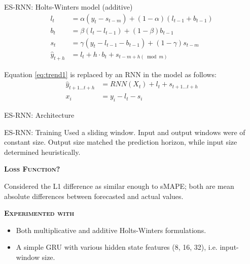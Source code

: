 \documentclass[aspectratio=169, 12pt]{beamer}
\begin{document}
\begin{frame}{ES-RNN: Holts-Winters model (additive)}
\begin{align}
    l_t &= \alpha (y_t - s_{t-m}) + (1 - \alpha) (l_{t-1} + b_{t-1}) \label{eq:level1}\\
    b_t &= \beta (l_t - l_{t-1}) + (1- \beta) b_{t-1} \label{eq:trend1}\\ 
    s_t &= \gamma (y_t - l_{t-1} - b_{t-1}) + (1-\gamma) s_{t-m} \label{eq:season1}\\
    \hat{y}_{t+h} &= l_t + h \cdot b_t + s_{t-m+h (\bmod m)} \label{eq:predEq1}
\end{align}

Equation \ref{eq:trend1} is replaced by an RNN in the model as follows:
\begin{align}
    \hat{y}_{t+1 \dots t+h} &= RNN(X_t) + l_t + s_{t+1 \dots t+h} \label{eq:modifiedEq1}\\
    x_i &= y_i - l_t - s_i \label{eq:x1}
\end{align}

\end{frame}

\begin{frame}[fragile]{ES-RNN: Architecture}
    \begin{figure}[htbp]
    \centering
    \def\svgwidth{\columnwidth}
    
    \end{figure}
\end{frame}

\begin{frame}{ES-RNN: Training}
Used a sliding window. Input and output windows were of constant size. Output size matched the prediction horizon, while input size determined heuristically.
\begin{center}
    \textsc{\textbf{Loss Function?}}
\end{center}
Considered the L1 difference as similar enough to sMAPE; both are mean absolute differences between forecasted and actual values.
\begin{center}
    \textsc{\textbf{Experimented with}}
\end{center}
    \begin{itemize}
        \item Both multiplicative and additive Holts-Winters formulations.
        \item A simple GRU with various hidden state features (8, 16, 32), i.e. input-window size.
    \end{itemize}
\end{frame}
\end{document}

